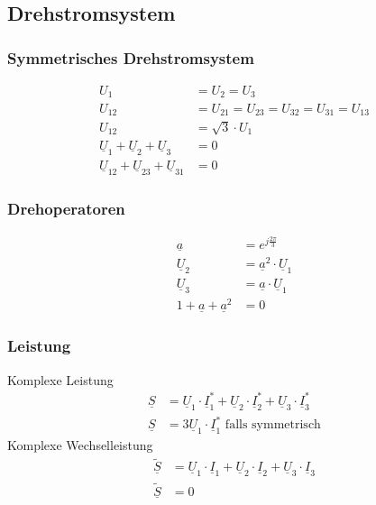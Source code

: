 \documentclass[a4paper,twocolumn,10pt]{article}
\begin{document}
\subsection{Drehstromsystem}

\subsubsection{Symmetrisches Drehstromsystem}
\begin{equation*}
\begin{split}
U_1&=U_2=U_3\\
U_{12}&=U_{21}=U_{23}=U_{32}=U_{31}=U_{13}\\
U_{12}&=\sqrt{3}\cdot U_1\\
\underline{U}_1+\underline{U}_2+\underline{U}_3&=0\\
\underline{U}_{12}+\underline{U}_{23}+\underline{U}_{31}&=0
\end{split}
\end{equation*}

\subsubsection{Drehoperatoren}
\begin{equation*}
\begin{split}
\underline{a}&=e^{j\frac{2\pi}{3}}\\
\underline{U}_2&=\underline{a}^2\cdot\underline{U}_1\\
\underline{U}_3&=\underline{a}\cdot\underline{U}_1\\
1+\underline{a}+\underline{a}^2&=0
\end{split}
\end{equation*}

\subsubsection{Leistung}
Komplexe Leistung
\begin{equation*}
\begin{split}
\underline{S}&=\underline{U}_1\cdot\underline{I}_1^*+\underline{U}_2\cdot\underline{I}_2^*+\underline{U}_3\cdot\underline{I}_3^*\\
\underline{S}&=3\underline{U}_1\cdot\underline{I}_1^*\text{ falls symmetrisch}
\end{split}
\end{equation*}
Komplexe Wechselleistung
\begin{equation*}
\begin{split}
\underline{\tilde{S}}&=\underline{U}_1\cdot\underline{I}_1+\underline{U}_2\cdot\underline{I}_2+\underline{U}_3\cdot\underline{I}_3\\
\underline{\tilde{S}}&=0
\end{split}
\end{equation*}
\end{document}
